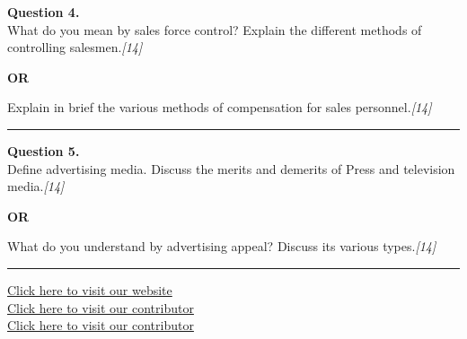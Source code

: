 \documentclass[11pt,a4paper]{article}
\newcommand{\pts}[1]{\hfill   \textit{[#1]}}
\begin{document}
\noindent   \textbf{Question 4.} \\
What do you mean by sales force control? Explain the different methods of controlling salesmen.\pts{14}

\centerline{   \textbf{OR}}

Explain in brief the various methods of compensation for sales personnel.\pts{14}

\medskip\rule{\linewidth}{0.2pt}




\noindent   \textbf{Question 5.} \\
Define advertising media. Discuss the merits and demerits of Press and television media.\pts{14}

\centerline{   \textbf{OR}}

What do you understand by advertising appeal? Discuss its various types.\pts{14}

\vfill
\rule{\linewidth}{0.4pt}

\begin{center}\small
\href{https://bhu-exam.vercel.app/}{Click here to visit our website}\\[4pt]
\href{https://me-aryan.vercel.app/}{Click here to visit our contributor}\\[4pt]
\href{https://quashan-me.vercel.app/}{Click here to visit our contributor}
\end{center}
\end{document}
